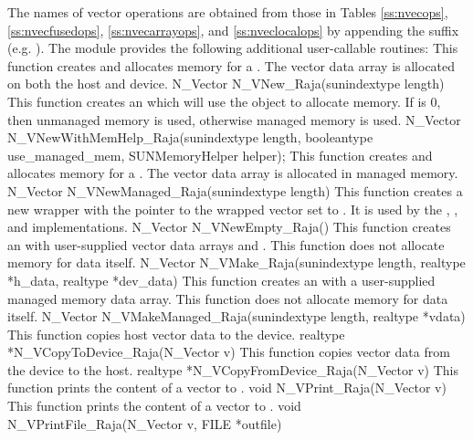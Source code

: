 The names of vector operations are obtained from those in Tables \ref{ss:nvecops},
\ref{ss:nvecfusedops}, \ref{ss:nvecarrayops}, and \ref{ss:nveclocalops}
by appending the suffix  (e.g. ).
The module {\nvecraja}  provides the following additional user-callable routines:
{
  This function creates and allocates memory for a {\raja} .
  The vector data array is allocated on both the host and device.
}
{
  N\_Vector N\_VNew\_Raja(sunindextype length)
}
{
  This function creates an {\nvecraja} which will use the 
  object to allocate memory. If  is 0, then unmanaged
  memory is used, otherwise managed memory is used.
}
{
  N\_Vector N\_VNewWithMemHelp\_Raja(sunindextype length,
                                     booleantype use\_managed\_mem,
                                     SUNMemoryHelper helper);
}
{
  This function creates and allocates memory for a {\raja} .
  The vector data array is allocated in managed memory.
}
{
  N\_Vector N\_VNewManaged\_Raja(sunindextype length)
}
{
  This function creates a new {\nvector} wrapper with the pointer to
  the wrapped {\raja} vector set to . It is used by the
  , , and 
  implementations.
}
{
  N\_Vector N\_VNewEmpty\_Raja()
}
{
  This function creates an {\nvecraja} with user-supplied vector data arrays
   and . This function does not allocate memory for
  data itself.
}
{
  N\_Vector N\_VMake\_Raja(sunindextype length, realtype *h\_data, realtype *dev\_data)
}
{
  This function creates an {\nvecraja} with a user-supplied managed memory data
  array. This function does not allocate memory for data itself.
}
{
  N\_Vector N\_VMakeManaged\_Raja(sunindextype length, realtype *vdata)
}
{
 This function copies host vector data to the device.
}
{
 realtype *N\_VCopyToDevice\_Raja(N\_Vector v)
}
{
  This function copies vector data from the device to the host.
}
{
  realtype *N\_VCopyFromDevice\_Raja(N\_Vector v)
}
{
  This function prints the content of a {\raja} vector to .
}
{
  void N\_VPrint\_Raja(N\_Vector v)
}
{
  This function prints the content of a {\raja} vector to .
}
{
  void N\_VPrintFile\_Raja(N\_Vector v, FILE *outfile)
}

